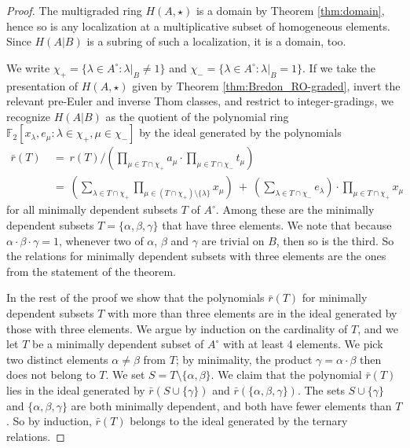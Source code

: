 \documentclass{amsart}[12pt]
\newcommand{\mF}{{\mathbb F}}
\numberwithin{equation}{section}
\theoremstyle{definition}
\begin{document}
\begin{proof}
  The multigraded ring $H(A,\star)$ is a domain by Theorem \ref{thm:domain},
  hence so is any localization at a multiplicative subset of homogeneous elements.
  Since $H(A|B)$ is a subring of such a localization, it is a domain, too.

  We write $\chi_+=\{\lambda\in A^\circ\colon \lambda|_B\ne 1\}$
  and $\chi_-=\{\lambda\in A^\circ\colon \lambda|_B= 1\}$.
  If we take the presentation of $H(A,\star)$
  given by Theorem \ref{thm:Bredon_RO-graded}, invert the relevant pre-Euler and
  inverse Thom classes, and restrict to integer-gradings,
  we recognize $H(A|B)$ as the quotient of the polynomial ring
  $\mF_2[x_\lambda, e_\mu\colon \lambda\in \chi_+,\mu\in\chi_-]$
  by the ideal generated by the polynomials
  \begin{align*}
    \bar r(T)\ &= \ r(T)/(\prod_{\mu\in T\cap\chi_+} a_\mu \cdot \prod_{\mu\in T\cap \chi_-} t_\mu) \\
    &= \ (\sum_{\lambda\in T\cap \chi_+} \prod_{\mu\in (T\cap\chi_+)\setminus\{\lambda\}} x_\mu)\
  + \ (\sum_{\lambda\in T\cap \chi_-} e_\lambda )\cdot\!\prod_{\mu\in T\cap\chi_+} x_\mu
  \end{align*}
  for all minimally dependent subsets $T$ of $A^\circ$.
  Among these are the minimally dependent subsets $T=\{\alpha,\beta,\gamma\}$
  that have three elements.
  We note that because $\alpha\cdot\beta\cdot\gamma=1$,
  whenever two of $\alpha$, $\beta$ and $\gamma$ are trivial on $B$, then so is the third.
  So the relations for  minimally dependent subsets with three elements
  are the ones from the statement of the theorem.
  
  In the rest of the proof we show that the polynomials $\bar r(T)$
  for  minimally dependent subsets $T$ with more than three elements
  are in the ideal generated by those with three elements.
  We argue by induction on the cardinality of $T$,
  and we let $T$ be a minimally dependent subset of $A^\circ$ with at least 4 elements.
  We pick two distinct elements $\alpha\ne \beta$ from $T$;
  by minimality, the product $\gamma=\alpha\cdot\beta$ then does not belong to $T$.
  We set $S=T\setminus\{\alpha,\beta\}$. We claim that 
  the polynomial $\bar r(T)$ lies in the ideal generated by
  $\bar r(S\cup\{\gamma\})$ and  $\bar r(\{\alpha,\beta,\gamma\})$.
  The sets $S\cup\{\gamma\}$ and $\{\alpha,\beta,\gamma\}$ are both minimally
  dependent, and both have fewer elements than $T$.
  So by induction, $\bar r(T)$ belongs to the ideal generated by the ternary relations.


\end{proof}
\end{document}
